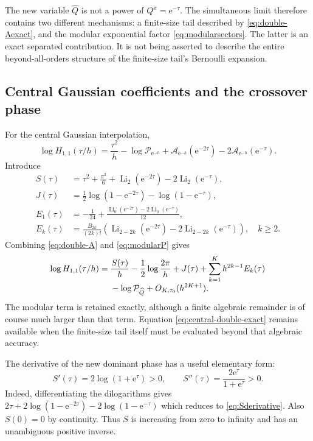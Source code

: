 \documentclass[11pt]{article}
\numberwithin{equation}{section}
\theoremstyle{definition}
\newcommand{\Li}{\operatorname{Li}}
\newcommand{\ee}{\mathrm e}
\begin{document}
The new variable $\widehat Q$ is not a power of $Q^x=\ee^{-\tau}$. The simultaneous limit therefore contains two different mechanisms: a finite-size tail described by \eqref{eq:double-Aexact}, and the modular exponential factor \eqref{eq:modularsectors}. The latter is an exact separated contribution. It is not being asserted to describe the entire beyond-all-orders structure of the finite-size tail's Bernoulli expansion.

\subsection{Central Gaussian coefficients and the crossover phase}

For the central Gaussian interpolation,
\begin{equation}\label{eq:central-double-exact}
 \log H_{1,1}(\tau/h)
 =\frac{\tau^2}{h}-\log\mathcal P_{\ee^{-h}}
 +\mathcal A_{\ee^{-h}}(\ee^{-2\tau})
 -2\mathcal A_{\ee^{-h}}(\ee^{-\tau}).
\end{equation}
Introduce
\begin{align}
 S(\tau)&=\tau^2+\frac{\pi^2}{6}
               +\Li_2(\ee^{-2\tau})-2\Li_2(\ee^{-\tau}),
 \label{eq:Sphase}\\
 J(\tau)&=\frac12\log(1-\ee^{-2\tau})
                  -\log(1-\ee^{-\tau}),\label{eq:Jamp}\\
 E_1(\tau)&=-\frac1{24}
       +\frac{\Li_0(\ee^{-2\tau})-2\Li_0(\ee^{-\tau})}{12},
 \label{eq:E1}\\
 E_k(\tau)&=\frac{B_{2k}}{(2k)!}
       \left(\Li_{2-2k}(\ee^{-2\tau})
                 -2\Li_{2-2k}(\ee^{-\tau})\right),\quad k\ge2.
 \label{eq:Ek}
\end{align}
Combining \eqref{eq:double-A} and \eqref{eq:modularP} gives
\begin{align}\label{eq:central-double-asympt}
 \log H_{1,1}(\tau/h)
 ={}&\frac{S(\tau)}h-\frac12\log\frac{2\pi}{h}+J(\tau)
     +\sum_{k=1}^K h^{2k-1}E_k(\tau)\\[-0.3em]
 &-\log\mathcal P_{\widehat Q}
     +O_{K,\tau_0}(h^{2K+1}).\notag
\end{align}
The modular term is retained exactly, although a finite algebraic remainder is of course much larger than that term. Equation \eqref{eq:central-double-exact} remains available when the finite-size tail itself must be evaluated beyond that algebraic accuracy.

The derivative of the new dominant phase has a useful elementary form:
\begin{equation}\label{eq:Sderivative}
 \boxed{\displaystyle
 S'(\tau)=2\log(1+\ee^{\tau})>0,\qquad
 S''(\tau)=\frac{2\ee^\tau}{1+\ee^\tau}>0.}
\end{equation}
Indeed, differentiating the dilogarithms gives
$2\tau+2\log(1-\ee^{-2\tau})-2\log(1-\ee^{-\tau})$
which reduces to \eqref{eq:Sderivative}. Also $S(0)=0$ by continuity. Thus $S$ is increasing from zero to infinity and has an unambiguous positive inverse.
\end{document}
